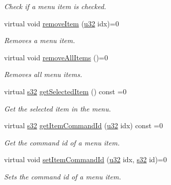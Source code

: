 \begin{DoxyCompactItemize}
\begin{DoxyCompactList}\small\item\em Check if a menu item is checked. \end{DoxyCompactList}\item 
virtual void \hyperlink{classirr_1_1gui_1_1IGUIContextMenu_af8cc0fc0f430044a318d4597f8535e9b}{remove\+Item} (\hyperlink{namespaceirr_a0416a53257075833e7002efd0a18e804}{u32} idx)=0
\begin{DoxyCompactList}\small\item\em Removes a menu item. \end{DoxyCompactList}\item 
\mbox{\label{classirr_1_1gui_1_1IGUIContextMenu_ac06b8d80fb076c6bed3aef2a17fb01f9}} 
virtual void \hyperlink{classirr_1_1gui_1_1IGUIContextMenu_ac06b8d80fb076c6bed3aef2a17fb01f9}{remove\+All\+Items} ()=0
\begin{DoxyCompactList}\small\item\em Removes all menu items. \end{DoxyCompactList}\item 
virtual \hyperlink{namespaceirr_ac66849b7a6ed16e30ebede579f9b47c6}{s32} \hyperlink{classirr_1_1gui_1_1IGUIContextMenu_ae6cd391cf56d4454a855e19feddf8fdc}{get\+Selected\+Item} () const =0
\begin{DoxyCompactList}\small\item\em Get the selected item in the menu. \end{DoxyCompactList}\item 
virtual \hyperlink{namespaceirr_ac66849b7a6ed16e30ebede579f9b47c6}{s32} \hyperlink{classirr_1_1gui_1_1IGUIContextMenu_a5edfede62ed558acd68b06eeea0682c3}{get\+Item\+Command\+Id} (\hyperlink{namespaceirr_a0416a53257075833e7002efd0a18e804}{u32} idx) const =0
\begin{DoxyCompactList}\small\item\em Get the command id of a menu item. \end{DoxyCompactList}\item 
virtual void \hyperlink{classirr_1_1gui_1_1IGUIContextMenu_a1380ff56d8c4c5b8de8d221062464654}{set\+Item\+Command\+Id} (\hyperlink{namespaceirr_a0416a53257075833e7002efd0a18e804}{u32} idx, \hyperlink{namespaceirr_ac66849b7a6ed16e30ebede579f9b47c6}{s32} id)=0
\begin{DoxyCompactList}\small\item\em Sets the command id of a menu item. \end{DoxyCompactList}\item 

\end{DoxyCompactItemize}
